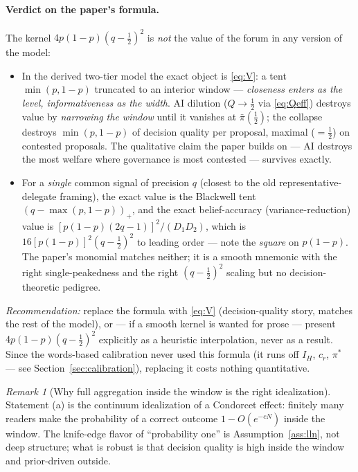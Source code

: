 \documentclass[11pt]{article}
\theoremstyle{remark}
\newtheorem{remark}{Remark}
\begin{document}
\paragraph{Verdict on the paper's formula.} The kernel
$4p(1-p)(q-\tfrac12)^2$ is \emph{not} the value of the forum in any version of
the model:
\begin{itemize}[itemsep=1pt]
\item In the derived two-tier model the exact object is \eqref{eq:V}: a tent
$\min(p,1-p)$ truncated to an interior window --- \emph{closeness enters as the
level, informativeness as the width}. AI dilution ($Q\to\tfrac12$ via
\eqref{eq:Qeff}) destroys value by \emph{narrowing the window} until it
vanishes at $\bar\pi(\tfrac12)$; the collapse destroys $\min(p,1-p)$ of decision
quality per proposal, maximal ($=\tfrac12$) on contested proposals. The
qualitative claim the paper builds on --- AI destroys the most welfare where
governance is most contested --- survives exactly.
\item For a \emph{single} common signal of precision $q$ (closest to the old
representative-delegate framing), the exact value is the Blackwell tent
$(q-\max(p,1-p))_+$, and the exact belief-accuracy (variance-reduction) value is
$[p(1-p)(2q-1)]^2/(D_1D_2)$, which is $16[p(1-p)]^2(q-\tfrac12)^2$ to leading
order --- note the \emph{square} on $p(1-p)$. The paper's monomial matches
neither; it is a smooth mnemonic with the right single-peakedness and the right
$(q-\tfrac12)^2$ scaling but no decision-theoretic pedigree.
\end{itemize}
\emph{Recommendation:} replace the formula with \eqref{eq:V} (decision-quality
story, matches the rest of the model), or --- if a smooth kernel is wanted for
prose --- present $4p(1-p)(q-\tfrac12)^2$ explicitly as a heuristic
interpolation, never as a result. Since the words-based calibration never used
this formula (it runs off $I_H$, $c_r$, $\pi^*$ --- see
Section~\ref{sec:calibration}), replacing it costs nothing quantitative.

\begin{remark}[Why full aggregation inside the window is the right idealization]
Statement (a) is the continuum idealization of a Condorcet effect: finitely many
readers make the probability of a correct outcome $1-O(e^{-cN})$ inside the
window. The knife-edge flavor of ``probability one'' is Assumption~\ref{ass:lln},
not deep structure; what is robust is that decision quality is high inside the
window and prior-driven outside.
\end{remark}
\end{document}
